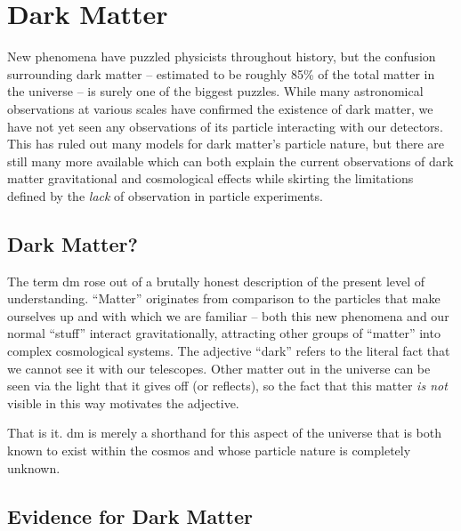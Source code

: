 \chapter{Dark Matter}
\label{chapter:dm}

New phenomena have puzzled physicists throughout history, but the confusion surrounding dark matter
-- estimated to be roughly 85\% of the total matter in the universe -- is surely one of the biggest
puzzles. While many astronomical observations at various scales have confirmed the existence of
dark matter, we have not yet seen any observations of its particle interacting with our detectors.
This has ruled out many models for dark matter's particle nature, but there are still many more
available which can both explain the current observations of dark matter gravitational and
cosmological effects while skirting the limitations defined by the \emph{lack} of observation in
particle experiments.

\section{Dark Matter?}
The term \ac{dm} rose out of a brutally honest description of the present level of understanding.
``Matter'' originates from comparison to the particles that make ourselves up and with which we are
familiar -- both this new phenomena and our normal ``stuff'' interact gravitationally, attracting
other groups of ``matter'' into complex cosmological systems. The adjective ``dark'' refers to the
literal fact that we cannot see it with our telescopes. Other matter out in the universe can be
seen via the light that it gives off (or reflects), so the fact that this matter \emph{is not}
visible in this way motivates the adjective.

That is it. \acf{dm} is merely a shorthand for this aspect of the universe that is both known to
exist within the cosmos and whose particle nature is completely unknown.

\section{Evidence for Dark Matter}
\label{sec:dm:evidence}

